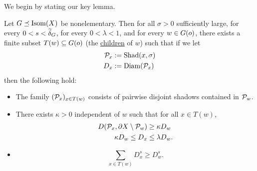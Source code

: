 We begin by stating our key lemma.

\begin{lemma}
\label{lemmaDSU}
Let $G\preceq\operatorname{Isom}(X)$ be nonelementary. Then for all $\sigma > 0$ sufficiently large, for every $0 < s < \widetilde\delta_G$, for every $0 < \lambda < 1$, and for every $w\in G(o)$, there exists a finite subset $T(w)\subseteq G(o)$ (the \underline{children} of $w$) such that if we let
\begin{align*}
\mathcal P_x &:= \operatorname{Shad}(x,\sigma)\\
D_x &:= \operatorname{Diam}(\mathcal P_x)
\end{align*}
then the following hold:
\begin{itemize}
\item[(i)] The family $(\mathcal P_x)_{x\in T(w)}$ consists of pairwise disjoint shadows contained in $\mathcal P_w$.
\item[(ii)] There exists $\kappa > 0$ independent of $w$ such that for all $x\in T(w)$,
\begin{align*}
D(\mathcal P_x,\partial X\setminus \mathcal P_w) &\geq \kappa D_w\\
\kappa D_w \leq D_x &\leq \lambda D_w.
\end{align*}
\item[(iii)]
\[
\sum_{x\in T(w)}D_x^s \geq D_w^s.
\]
\end{itemize}
\end{lemma}

